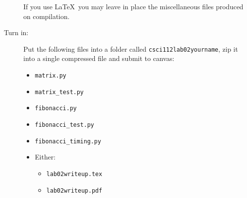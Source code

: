 \documentclass{article}
\newcommand{\bi}{\begin{itemize}}
\newcommand{\li}{\item}
\newcommand{\ei}{\end{itemize}}
\begin{document}
\begin{description}
 If you use \LaTeX\ you may leave in place the miscellaneous
 files produced on compilation. 
 
 \item[Turn in:] Put the following files into a folder called {\tt csci112lab02yourname},
 zip it into a single compressed file and submit to canvas:

\bi
\li \lstinline{matrix.py}
\li \lstinline{matrix_test.py}
\li \lstinline{fibonacci.py}
\li \lstinline{fibonacci_test.py}
\li \lstinline{fibonacci_timing.py}
\li Either:
\bi
\li \lstinline{lab02writeup.tex}
\li \lstinline{lab02writeup.pdf}
\ei
\ei
 


\end{description}
\end{document}
